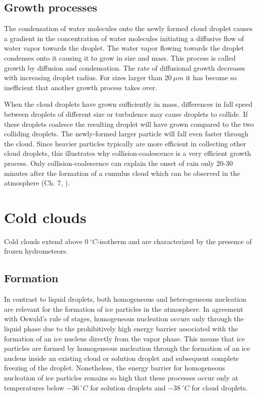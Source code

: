 \subsection{Growth processes}

The condensation of water molecules onto the newly formed cloud droplet causes a
gradient in the concentration of water molecules initiating  a diffusive flow
of water vapor towards the droplet. The water vapor flowing towards the droplet
condenses onto it causing it to grow in size and mass. This process is called
growth by diffusion and condensation. The rate of diffusional growth decreases
with increasing droplet radius. For sizes larger than  $20\ \unit{\mu m}$ 
it has become so inefficient that another growth process takes over.

When the cloud droplets have grown sufficiently in mass, differences in fall
speed between droplets of different size or turbulence may cause droplets to
collide. If these droplets coalesce the resulting droplet will have grown
compared to the two colliding droplets. The newly-formed larger particle will
fall even faster through the cloud. Since heavier particles typically are
more efficient in collecting other cloud droplets, this illustrates why
collision-coalescence is a very efficient growth process. Only
collision-coalescence can explain the onset of rain only 20-30 minutes after the
formation of a cumulus cloud which can be observed in the atmosphere
(Ch. 7, \textcite{lohmann16}).

\section{Cold clouds}

Cold clouds extend  above $0\ \unit{^\circ C}$-isotherm and are characterized
by the presence of frozen hydrometeors.


\subsection{Formation}

In contrast to liquid droplets, both homogeneous and heterogeneous nucleation
are relevant for the formation of ice particles in the atmosphere. In agreement
with Oswald's rule of stages, homogeneous nucleation occurs only through the liquid
phase due to the prohibitively high energy barrier associated with the formation
of an ice nucleus directly from the vapor phase. This means that ice particles
are formed by homogeneous nucleation through the formation of an ice nucleus
inside an existing cloud or solution droplet and subsequent complete freezing of
the droplet. Nonetheless, the energy barrier for homogeneous nucleation of ice
particles remains so high that these processes occur only at
temperatures below $-36\ \unit{^\circ C}$ for solution droplets and
$-38\ \unit{^\circ C}$ for cloud droplets.

